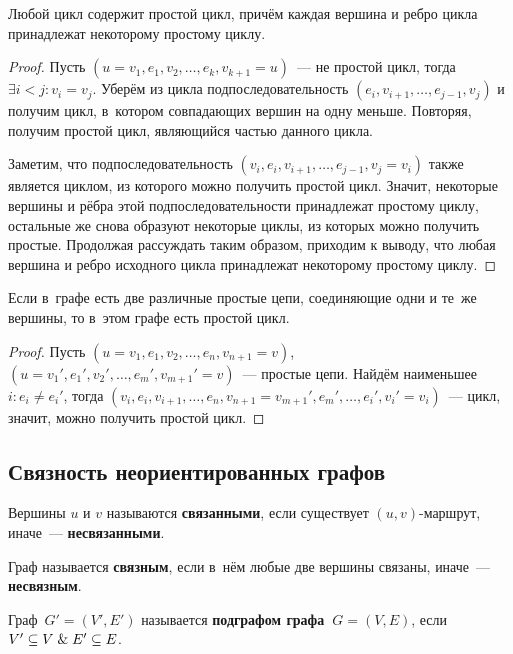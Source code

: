 \begin{lemma}
\label{lemma:cycle_contains_simple_one}
Любой цикл содержит простой цикл, причём каждая вершина и ребро цикла принадлежат некоторому простому циклу.
\end{lemma}
\begin{proof}
Пусть $(u = v_1, e_1, v_2, \ldots, e_k, v_{k+1} = u)$~--- не простой цикл, тогда $\exists i < j \colon v_i = v_j$.
Уберём из цикла подпоследовательность $(e_i, v_{i+1}, \ldots, e_{j-1}, v_j)$ и получим цикл, в~котором совпадающих вершин на одну меньше.
Повторяя, получим простой цикл, являющийся частью данного цикла.

Заметим, что подпоследовательность $(v_i, e_i, v_{i+1}, \ldots, e_{j-1}, v_j = v_i)$ также является циклом, из которого можно получить простой цикл.
Значит, некоторые вершины и рёбра этой подпоследовательности принадлежат простому циклу, остальные же снова образуют некоторые циклы, из которых можно получить простые.
Продолжая рассуждать таким образом, приходим к выводу, что любая вершина и ребро исходного цикла принадлежат некоторому простому циклу.
\end{proof}
	
\begin{lemma}
\label{lemma:existence_of_simple_cycle}
Если в~графе есть две различные простые цепи, соединяющие одни и те~же вершины, то в~этом графе есть простой цикл.
\end{lemma}
\begin{proof}
Пусть $(u = v_1, e_1, v_2, \ldots, e_n, v_{n+1} = v)$, $(u = v_1', e_1', v_2', \ldots, e_m', v_{m+1}' = v)$~--- простые цепи.
Найдём наименьшее~$i \colon e_i \neq e_i'$, тогда $(v_i, e_i, v_{i+1}, \ldots, e_n, v_{n+1} = v_{m+1}', e_m', \ldots, e_i', v_i' = v_i)$~--- цикл, значит, можно получить простой цикл.
\end{proof}

\subsection{Связность неориентированных графов}
Вершины $u$ и $v$ называются \textbf{связанными}, если существует $(u, v)$-маршрут, иначе~--- \textbf{несвязанными}.

 Граф называется \textbf{связным}, если в~нём любые две вершины связаны, иначе~--- \textbf{несвязным}.

Граф~$G' = (V', E')$ называется \textbf{подграфом графа~$G = (V, E)$}, если $V' \subseteq V \mathrel{\&} E' \subseteq E$.

